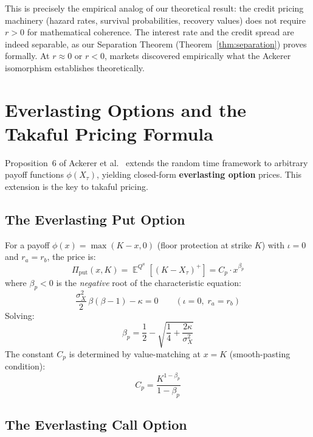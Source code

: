 \documentclass[10pt,twocolumn]{article}
\theoremstyle{plain}
\theoremstyle{definition}
\DeclareMathOperator{\E}{\mathbb{E}}
\newcommand{\Qa}{Q^a}
\begin{document}
This is precisely the empirical analog of our theoretical result:
the credit pricing machinery (hazard rates, survival probabilities,
recovery values) does not require $r > 0$ for mathematical
coherence. The interest rate and the credit spread are indeed
separable, as our Separation Theorem (Theorem~\ref{thm:separation})
proves formally. At $r \approx 0$ or $r < 0$, markets discovered
empirically what the Ackerer isomorphism establishes theoretically.

\section{Everlasting Options and the Takaful Pricing Formula}
\label{sec:everlasting}

Proposition~6 of Ackerer et al.\ \cite{Ackerer2024} extends the
random time framework to arbitrary payoff functions $\phi(X_\tau)$,
yielding closed-form \textbf{everlasting option} prices. This
extension is the key to takaful pricing.

\subsection{The Everlasting Put Option}

For a payoff $\phi(x) = \max(K - x, 0)$ (floor protection at
strike $K$) with $\iota = 0$ and $r_a = r_b$, the price is:
\begin{equation}
\Pi_{\mathrm{put}}(x, K)
= \E^{\Qa}\!\left[(K - X_\tau)^+\right]
= C_p \cdot x^{\beta_p}
\label{eq:evput}
\end{equation}
where $\beta_p < 0$ is the \textit{negative} root of the
characteristic equation:
\begin{equation}
\frac{\sigma_X^2}{2}\,\beta(\beta-1) - \kappa = 0
\qquad (\iota = 0,\;r_a = r_b)
\label{eq:char_eq}
\end{equation}
Solving:
\begin{equation}
\beta_p = \frac{1}{2} - \sqrt{\frac{1}{4} + \frac{2\kappa}{\sigma_X^2}}
\label{eq:beta_p}
\end{equation}
The constant $C_p$ is determined by value-matching at $x = K$
(smooth-pasting condition):
\begin{equation}
C_p = \frac{K^{1-\beta_p}}{1 - \beta_p}
\label{eq:Cp}
\end{equation}

\subsection{The Everlasting Call Option}
\end{document}
